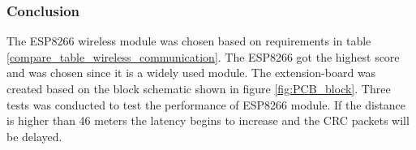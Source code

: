 \subsubsection*{Conclusion}
The ESP8266 wireless module was chosen based on requirements in table \ref{compare_table_wireless_communication}. The ESP8266 got the highest score and was chosen since it is a widely used module. The extension-board was created based on the block schematic shown in figure \ref{fig:PCB_block}. Three tests was conducted to test the performance of ESP8266 module. If the distance is higher than 46 meters the latency begins to increase and the CRC packets will be delayed.


